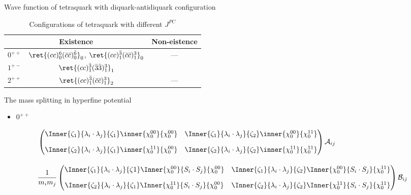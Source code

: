\begin{frame}{Wave function of tetraquark with diquark-antidiquark configuration}
    \begin{table}[htbp]
        \begin{tabular}{l|c|c}
            \toprule[1pt]
            \multicolumn{2}{c}{Existence} & Non-eistence                                                                                                         \\\midrule
            $0^{++}$                      & $\ret{(cc)^{6}_{0}(\bar{c}\bar{c})^{\bar{6}}_{0}}_{0}$, $\ret{(cc)_{1}^{\bar{3}}(\bar{c}\bar{c})^{3}_{1}}_{0}$ & --- \\[10pt]
            $1^{+-}$                      & $\ret{(cc)^{\bar{3}}_{1}(\bar{3}\bar{3})_{1}^{3}}_{1}$                                                         & ~   \\[10pt]
            $2^{++}$                      & $\ret{(cc)_{1}^{\bar{3}}(\bar{c}\bar{c})_{1}^{3}}_{2}$                                                         & ---
            \\\bottomrule[1pt]
        \end{tabular}
        \caption{Configurations of tetraquark with different $J^{PC}$}
    \end{table}
\end{frame}
\begin{frame}{The mass splitting in hyperfine potential}
    \begin{itemize}
        \item $0^{++}$
    \end{itemize}
    \begin{align}
         &
        \begin{pmatrix}
            \Inner{\zeta_{1}}{\lambda_{i}\cdot\lambda_{j}}{\zeta_{1}}\inner{\chi^{00}_{0}}{\chi^{00}_{0}} & \Inner{\zeta_{1}}{\lambda_{i}\cdot\lambda_{j}}{\zeta_{2}}\inner{\chi^{00}_{0}}{\chi^{11}_{0}} \\[10pt]
            \Inner{\zeta_{2}}{\lambda_{i}\cdot\lambda_{j}}{\zeta_{1}}\inner{\chi^{11}_{0}}{\chi^{00}_{0}} & \Inner{\zeta_{2}}{\lambda_{i}\cdot\lambda_{j}}{\zeta_{2}}\inner{\chi^{11}_{0}}{\chi^{11}_{0}}
        \end{pmatrix}\mathcal{A}_{ij} \\[10pt]
         &
        \frac{1}{m_{i}m_{j}}
        \begin{pmatrix}
            \Inner{\zeta_{1}}{\lambda_{i}\cdot\lambda_{j}}{\zeta{1}}\Inner{\chi^{00}_{0}}{S_{i}\cdot S_{j}}{\chi^{00}_{0}}  & \Inner{\zeta_{1}}{\lambda_{i}\cdot\lambda_{j}}{\zeta_{2}}\Inner{\chi^{00}_{0}}{S_{i}\cdot S_{j}}{\chi^{11}_{0}} \\[10pt]
            \Inner{\zeta_{2}}{\lambda_{i}\cdot\lambda_{j}}{\zeta_{1}}\Inner{\chi^{11}_{0}}{S_{i}\cdot S_{j}}{\chi^{00}_{0}} & \Inner{\zeta_{2}}{\lambda_{i}\cdot\lambda_{j}}{\zeta_{2}}\Inner{\chi^{11}_{0}}{S_{i}\cdot S_{j}}{\chi^{11}_{0}}
        \end{pmatrix}\mathcal{B}_{ij}
    \end{align}

\end{frame}
